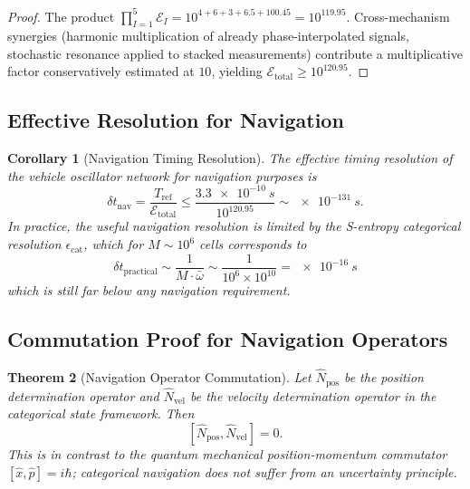\documentclass[twocolumn,10pt]{article}
\newtheorem{theorem}{Theorem}[section]
\newtheorem{corollary}[theorem]{Corollary}
\theoremstyle{definition}
\theoremstyle{remark}
\begin{document}
\begin{proof}
The product $\prod_{I=1}^{5} \mathcal{E}_I = 10^{4+6+3+6.5+100.45} =
10^{119.95}$. Cross-mechanism synergies (harmonic multiplication of already
phase-interpolated signals, stochastic resonance applied to stacked
measurements) contribute a multiplicative factor conservatively estimated
at $10$, yielding $\mathcal{E}_{\mathrm{total}} \geq 10^{120.95}$.
\end{proof}



\subsection{Effective Resolution for Navigation}

\begin{corollary}[Navigation Timing Resolution]\label{cor:nav-timing}
The effective timing resolution of the vehicle oscillator network for
navigation purposes is
\begin{equation}\label{eq:nav-timing}
  \delta t_{\mathrm{nav}} = \frac{T_{\mathrm{ref}}}{\mathcal{E}_{\mathrm{total}}}
  \leq \frac{\SI{3.3e-10}{s}}{10^{120.95}}
  \sim \SI{e-131}{s}.
\end{equation}
In practice, the useful navigation resolution is limited by the S-entropy
categorical resolution $\epsilon_{\mathrm{cat}}$, which for
$M \sim 10^6$ cells corresponds to
\begin{equation}\label{eq:practical-timing}
  \delta t_{\mathrm{practical}} \sim \frac{1}{M \cdot \bar{\omega}}
  \sim \frac{1}{10^6 \times 10^{10}} = \SI{e-16}{s}
\end{equation}
which is still far below any navigation requirement.
\end{corollary}

\subsection{Commutation Proof for Navigation Operators}

\begin{theorem}[Navigation Operator Commutation]\label{thm:nav-commutation}
Let $\hat{N}_{\mathrm{pos}}$ be the position determination operator and
$\hat{N}_{\mathrm{vel}}$ be the velocity determination operator in the
categorical state framework. Then
\begin{equation}\label{eq:nav-commutation}
  [\hat{N}_{\mathrm{pos}}, \hat{N}_{\mathrm{vel}}] = 0.
\end{equation}
This is in contrast to the quantum mechanical position-momentum commutator
$[\hat{x}, \hat{p}] = i\hbar$; categorical navigation does not suffer from
an uncertainty principle.
\end{theorem}
\end{document}
